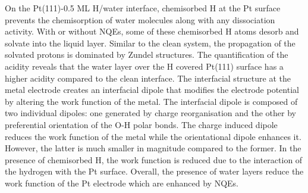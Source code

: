 On the Pt(111)-0.5 ML H/water interface, chemisorbed H at the Pt surface prevents the chemisorption of water molecules along with any dissociation activity. With or without NQEs, some of these chemisorbed H atoms desorb and solvate into the liquid layer. Similar to the clean system, the propagation of the solvated protons is dominated by Zundel structures. The quantification of the acidity reveals that the water layer over the H covered Pt(111) surface has a higher acidity compared to the clean interface. The interfacial structure at the metal electrode creates an interfacial dipole that modifies the electrode potential by altering the work function of the metal. The interfacial dipole is composed of two individual dipoles: one generated by charge reorganisation and the other by preferential orientation of the O-H polar bonds. The charge induced dipole reduces the work function of the metal while the orientational dipole enhances it. However, the latter is much smaller in magnitude compared to the former. In the presence of chemisorbed H, the work function is reduced due to the interaction of the hydrogen with the Pt surface. Overall, the presence of water layers reduce the work function of the Pt electrode which are enhanced by NQEs.